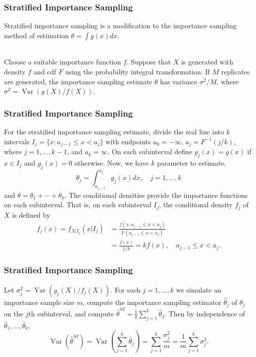 \documentclass{beamer}
\begin{document}
\begin{frame}[fragile]
\frametitle{Stratified Importance Sampling}

Stratified importance sampling is a modification to the importance sampling method of estimation $\theta = \int g(x)dx$.\\~\

Choose a suitable importance function $f$. Suppose that $X$ is generated with density $f$ and cdf $F$ using the probability integral transformation. If $M$ replicates are generated, the importance sampling estimate $\theta$ has variance $\sigma^2/M$, where $\sigma^2=\operatorname{Var}\left(g(X)/f(X)\right)$.
\end{frame}

\begin{frame}[fragile]
\frametitle{Stratified Importance Sampling}

For the stratified importance sampling estimate, divide the real line into $k$ intervals $I_j=\{x:a_{j-1}\leq x <a_j\}$ with endpoints $a_0=-\infty$, $a_j=F^{-1}(j/k)$, where $j=1,\ldots,k-1$, and $a_k=\infty$. On each subinterval define $g_j(x)=g(x)$ if $x\in I_j$ and $g_j(x)=0$ otherwise. Now, we have $k$ parameter to estimate,
\[
\theta_j=\int_{a_{j-1}}^{a_j} g_j(x)dx,\quad j=1,\ldots,k
\]
and $\theta=\theta_1+\cdots+\theta_k$. The conditional densities provide the importance functions on each subinterval. That is, on each subinterval $I_j$, the conditional density $f_j$ of $X$ is defined by
\begin{align*}
f_j(x)=f_{X|I_j}(x|I_j) &=\frac{f(x,a_{j-1}\leq x<a_j)}{\mathbb{P}(a_{j-1}\leq x<a_j)}\\
&=\frac{f(x)}{1/k}=kf(x),\quad a_{j-1}\leq x<a_j.
\end{align*}
\end{frame}

\begin{frame}[fragile]
\frametitle{Stratified Importance Sampling}

Let $\sigma_j^2=\operatorname{Var}\left(g_j(X)/f_j(X)\right)$. For each $j= 1,\ldots,k$ we simulate an importance sample size $m$, compute the importance sampling estimator $\widehat{\theta}_{j}$ of $\theta_j$ on the $j$th subinterval, and compute $\widehat{\theta}^{SI}=\frac{1}{k}\sum_{j=1}^k\widehat{\theta}_{j}$. Then by independence of $\widehat{\theta}_{1},\ldots,\widehat{\theta}_{k}$,
\[
\operatorname{Var}\left(\widehat{\theta}^{SI}\right)=\operatorname{Var}\left(\sum_{j=1}^k\widehat{\theta}_{j}\right)=\sum_{j=1}^k\frac{\sigma_j^2}{m}=\frac{1}{m}\sum_{j=1}^k\sigma_j^2.
\]
\end{frame}
\end{document}
